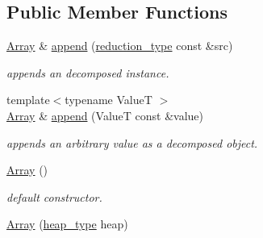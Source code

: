 \subsection*{Public Member Functions}
\begin{DoxyCompactItemize}
\item 
\hypertarget{classhryky_1_1reduction_1_1_array_aec3f3c562f47d02096be058fb04599c8}{\hyperlink{classhryky_1_1reduction_1_1_array}{Array} \& \hyperlink{classhryky_1_1reduction_1_1_array_aec3f3c562f47d02096be058fb04599c8}{append} (\hyperlink{namespacehryky_a343a9a4c36a586be5c2693156200eadc}{reduction\-\_\-type} const \&src)}\label{classhryky_1_1reduction_1_1_array_aec3f3c562f47d02096be058fb04599c8}

\begin{DoxyCompactList}\small\item\em appends an decomposed instance. \end{DoxyCompactList}\item 
\hypertarget{classhryky_1_1reduction_1_1_array_ab4f43bd47a0ef7060e7b2818243199bd}{{\footnotesize template$<$typename Value\-T $>$ }\\\hyperlink{classhryky_1_1reduction_1_1_array}{Array} \& \hyperlink{classhryky_1_1reduction_1_1_array_ab4f43bd47a0ef7060e7b2818243199bd}{append} (Value\-T const \&value)}\label{classhryky_1_1reduction_1_1_array_ab4f43bd47a0ef7060e7b2818243199bd}

\begin{DoxyCompactList}\small\item\em appends an arbitrary value as a decomposed object. \end{DoxyCompactList}\item 
\hypertarget{classhryky_1_1reduction_1_1_array_ab147d559f9c3f32624108e0ddd91cc8a}{\hyperlink{classhryky_1_1reduction_1_1_array_ab147d559f9c3f32624108e0ddd91cc8a}{Array} ()}\label{classhryky_1_1reduction_1_1_array_ab147d559f9c3f32624108e0ddd91cc8a}

\begin{DoxyCompactList}\small\item\em default constructor. \end{DoxyCompactList}\item 
\hypertarget{classhryky_1_1reduction_1_1_array_a40c0a26615c8ac4ec82d4c1f07b22cbc}{\hyperlink{classhryky_1_1reduction_1_1_array_a40c0a26615c8ac4ec82d4c1f07b22cbc}{Array} (\hyperlink{classhryky_1_1memory_1_1heap_1_1_base}{heap\-\_\-type} heap)}\label{classhryky_1_1reduction_1_1_array_a40c0a26615c8ac4ec82d4c1f07b22cbc}


\end{DoxyCompactItemize}
